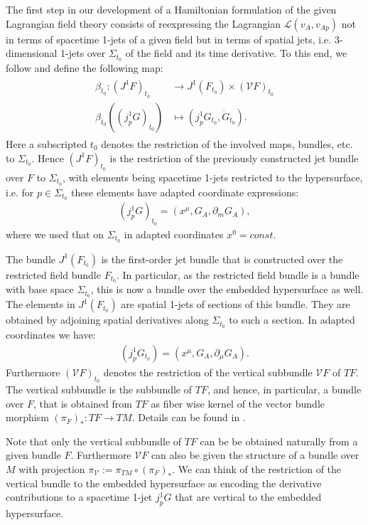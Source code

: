\documentclass[a4paper,12pt, DIV=14, BCOR=5mm, twoside, headsepline, numbers=noenddot]{scrbook}
\begin{document}
The first step in our development of a Hamiltonian formulation of the given Lagrangian field theory consists of reexpressing the Lagrangian $\mathcal{L}(v_A,v_{Ap})$ not in terms of spacetime 1-jets of a given field but in terms of spatial jets, i.e. 3-dimensional 1-jets over $\Sigma_{t_0}$ of the field and its time derivative. To this end, we follow \cite{2004math.ph..11032G} and define the following map:
\begin{align}
    \begin{aligned}
    \beta_{t_0} : (J^1F)_{t_0} &\longrightarrow J^1(F_{t_0}) \times (\mathcal{V}F)_{t_0} \\
    \beta_{t_0}((j^1_pG)_{t_0}) &\longmapsto (j^1_pG_{t_0}, \dot{G}_{t_0}).
    \end{aligned}
\end{align}
Here a subscripted $t_0$ denotes the restriction of the involved maps, bundles, etc. to $\Sigma_{t_0}$. Hence $(J^1F)_{t_0}$ is the restriction of the previously constructed jet bundle over $F$ to $\Sigma_{t_0}$, with elements being spacetime 1-jets restricted to the hypersurface, i.e. for $p \in \Sigma_{t_0}$ these elements have adapted coordinate expressions: 
\begin{align}
(j^1_pG)_{t_0} = (x^{\mu},G_A,\partial_m G_A),
\end{align}
where we used that on $\Sigma_{t_0}$ in adapted coordinates $x^0=const$. 

The bundle $J^1(F_{t_0})$ is the first-order jet bundle that is constructed over the restricted field bundle $F_{t_0}$. In particular, as the restricted field bundle is a bundle with base space $\Sigma_{t_0}$, this is now a bundle over the embedded hypersurface as well. The elements in $J^1(F_{t_0})$ are spatial 1-jets of sections of this bundle. They are obtained by adjoining spatial derivatives along $\Sigma_{t_0}$ to such a section. In adapted coordinates we have: 
\begin{align}
(j^1_pG_{t_0}) = (x^{\mu},G_A,\partial_{\mu} G_A).
\end{align}
Furthermore $(\mathcal{V}F)_{t_0}$ denotes the restriction of the vertical subbundle $\mathcal{V}F$ of $TF$. The vertical subbundle is the subbundle of $TF$, and hence, in particular, a bundle over $F$, that is obtained from $TF$ as fiber wise kernel of the vector bundle morphism $(\pi_F)_{\ast} : TF \rightarrow
TM$. Details can be found in \cite{1998physics...1019G}. 

Note that only the vertical subbundle of $TF$ can be be obtained naturally from a given bundle $F$. Furthermore $\mathcal{V}F$ can also be given the structure of a bundle over $M$ with projection $\pi_{\mathcal{V}}:=\pi_{TM} \circ (\pi_F)_{\ast}$. We can think of the restriction of the vertical bundle to the embedded hypersurface as encoding the derivative contributions to a spacetime 1-jet $j^1_pG$ that are vertical to the embedded hypersurface.
\end{document}
